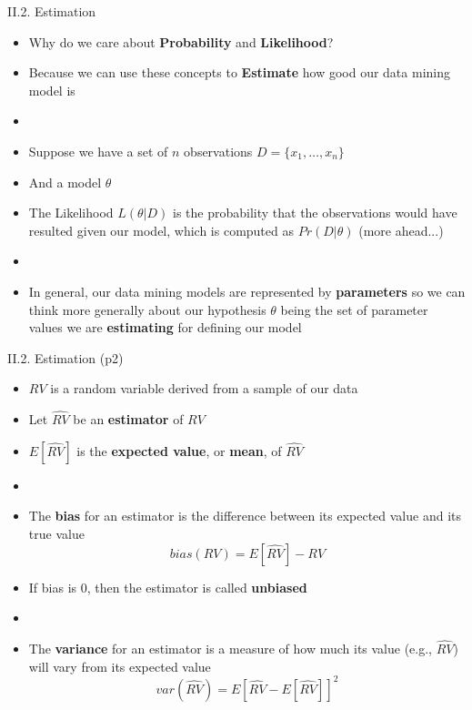 \documentclass[handout]{beamer}
\newcommand{\strong}[1]{\textbf{\color{teal} #1}}
\newcommand{\stronger}[1]{\textbf{\color{purple} #1}}
\begin{document}
\begin{frame}{II.2. Estimation}
\begin{itemize}
\item Why do we care about \strong{Probability} and \strong{Likelihood}?
\item Because we can use these concepts to \stronger{Estimate} how good our data mining model is
\item[]
\item Suppose we have a set of $n$ observations $D = \{ x_1, \ldots, x_n \}$
\item And a model $\theta$
\item The Likelihood $L(\theta|D)$ is the probability that the observations would have resulted given our model, which is computed as $Pr(D|\theta)$ (more ahead...)
\item[]
\item In general, our data mining models are represented by \strong{parameters} so we can think more generally about our hypothesis $\theta$ being the set of parameter values we are \strong{estimating} for defining our model
\end{itemize}
\end{frame}
\begin{frame}{II.2. Estimation (p2)}
\begin{itemize}
\item $RV$ is a random variable derived from a sample of our data
\item Let $\hat{RV}$ be an \stronger{estimator} of $RV$
\item $E[\hat{RV}]$ is the \stronger{expected value}, or \stronger{mean}, of $\hat{RV}$
\item[]
\item The \stronger{bias} for an estimator is the difference between its expected value and its true value
\[
bias(RV) = E[\hat{RV}] - RV
\]
\item If bias is $0$, then the estimator is called \stronger{unbiased}
\item[]
\item The \stronger{variance} for an estimator is a measure of how much its value (e.g., $\hat{RV}$) will vary from its expected value
\[
var(\hat{RV}) = E [ \hat{RV} - E [ \hat{RV} ]]^2
\]
\end{itemize}
\end{frame}
\end{document}
